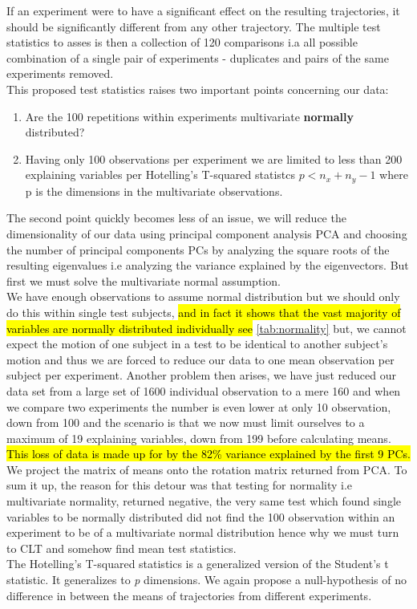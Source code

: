 \documentclass{article}
\begin{document}
If an experiment were to have a significant effect on the resulting trajectories, it should be significantly different from any other trajectory. The multiple test statistics to asses is then a collection of 120 comparisons i.a all possible combination of a single pair of experiments - duplicates and pairs of the same experiments removed.\\ 
This proposed test statistics raises two important points concerning our data:
\begin{enumerate}
	\item  Are the 100 repetitions within experiments multivariate \textbf{normally} distributed?
	\item Having only 100 observations per experiment we are limited to less than 200 explaining variables per Hotelling's T-squared statistcs $p < n_x + n_y -1$ where p is the dimensions in the multivariate observations.
\end{enumerate}

The second point quickly becomes less of an issue, we will reduce the dimensionality of our data using principal component analysis PCA and choosing the number of principal components PCs by analyzing the square roots of the resulting eigenvalues i.e analyzing the variance explained by the eigenvectors. But first we must solve the multivariate normal assumption. \\
 We have enough observations to assume normal distribution but we should only do this within single test subjects, \hl{and in fact it shows that the vast majority of variables are normally distributed individually see} \ref{tab:normality} but, we cannot expect the motion of one subject in a test to be identical to another subject's motion and thus we are forced to reduce our data to one mean observation per subject per experiment. Another problem then arises, we have just reduced our data set from a large set of 1600 individual observation to a mere 160 and when we compare two experiments the number is even lower at only 10 observation, down from 100 and the scenario is that we now must limit ourselves to a maximum of 19 explaining variables, down from 199 before calculating means.\\
\hl{This loss of data is made up for by the 82\% variance explained by the first 9 PCs.} We project the matrix of means onto the rotation matrix returned from PCA. To sum it up, the reason for this detour was that testing for normality i.e multivariate normality, returned negative, the very same test which found single variables to be normally distributed did not find the 100 observation within an experiment to be of a multivariate normal distribution hence why we must turn to CLT and somehow find mean test statistics.\\
The Hotelling's T-squared statistics is a generalized version of the Student's t statistic. It generalizes to \textit{p} dimensions. We again propose a null-hypothesis of no difference in between the means of trajectories from different experiments. 
\end{document}

